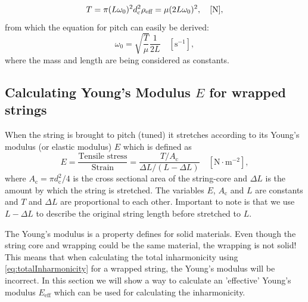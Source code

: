 \documentclass{article}
\begin{document}
\begin{sloppy}
\begin{equation}\label{eq:tension}
    T = \pi (L\omega_0)^2d_\text{c}^2\rho_{\textup{eff}} = \mu(2L\omega_0)^2, \quad [\text{N}],
\end{equation}
from which the equation for pitch can easily be derived:
\begin{equation}
    \omega_0 = \sqrt{\frac{T}{\mu}} \frac{1}{2L} \quad [\text{s}^{-1}],
\end{equation}
where the mass and length are being considered as constants. 
%
%
%
%
\subsection{Calculating Young's Modulus $E$ for wrapped strings}%
%
When the string is brought to pitch (tuned) it stretches according to its Young's modulus (or elastic modulus) $E$ which is defined as
%
\begin{equation}\label{eq:tensile_stress}
    E = \frac{\text{Tensile stress}}{\text{Strain}}
    = \frac{T/A_\text{c}}{\Delta L/(L - \Delta L)} \quad [\text{N}\cdot\text{m}^{-2}], 
\end{equation}
%
where $A_\text{c} = \pi d_\text{c}^2/4$ is the cross sectional area of the string-core and $\Delta L$ is the amount by which the string is stretched. The variables $E$, $A_\text{c}$ and $L$ are constants and $T$ and $\Delta L$ are proportional to each other. Important to note is that we use $L - \Delta L$ to describe the original string length before stretched to $L$.

The Young's modulus is a property defines for solid materials. Even though the string core and wrapping could be the same material, the wrapping is not solid! This means that when calculating the total inharmonicity using \eqref{eq:totalInharmonicity} for a wrapped string, the Young's modulus will be incorrect. In this section we will show a way to calculate an 'effective' Young's modulus $E_\text{eff}$ which can be used for calculating the inharmonicity. 


\end{sloppy}
\end{document}
